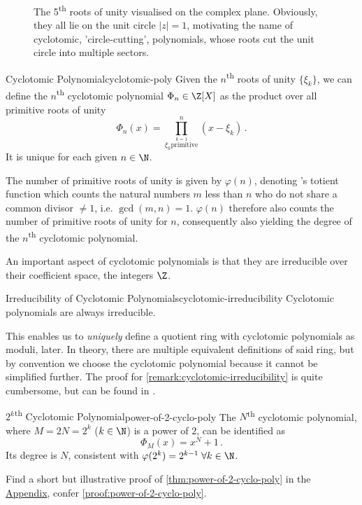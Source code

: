 \begin{figure}
  \centering
  \caption[The 5th roots of unity]{The 5\textsuperscript{th} roots of unity visualised on the complex plane. Obviously, they all lie on the unit circle $|z| = 1$, motivating the name of cyclotomic, 'circle-cutting', polynomials, whose roots cut the unit circle into multiple sectors.}
  \label{fig:nth-roots-of-unity}
\end{figure}

\begin{definition}{Cyclotomic Polynomial}{cyclotomic-poly}
  Given the $n$\textsuperscript{th} roots of unity $\{\xi_k\}$, we can define the $n$\textsuperscript{th}
  cyclotomic polynomial $\Phi_n \in \Z[X]$ as the product over all primitive roots of unity
  $$\Phi_n(x) = \prod_{\stackrel{k=1}{\xi_k \mathrm{primitive}}}^{n} (x - \xi_k) \,.$$
  It is unique for each given $n \in \N$.
\end{definition}
The number of primitive roots of unity is given by $\varphi(n)$, denoting 's totient function which counts the natural numbers $m$ less than $n$ who do not share a common divisor $\neq 1$, i.e. $\gcd(m, n) = 1$.
$\varphi(n)$ therefore also counts the number of primitive roots of unity for $n$, consequently also yielding the degree of the $n$\textsuperscript{th} cyclotomic polynomial.

An important aspect of cyclotomic polynomials is that they are irreducible over their coefficient space, the integers $\Z$.
\begin{remark}{Irreducibility of Cyclotomic Polynomials}{cyclotomic-irreducibility}
  Cyclotomic polynomials are always irreducible.
\end{remark}
This enables us to \textit{uniquely} define a quotient ring with cyclotomic polynomials as moduli, later.
In theory, there are multiple equivalent definitions of said ring, but by convention we choose the cyclotomic polynomial because it cannot be simplified further.
The proof for \autoref{remark:cyclotomic-irreducibility} is quite cumbersome, but can be found in \cite{2002-serge-algebra}.

\begin{theorem}{$2^k$\textsuperscript{th} Cyclotomic Polynomial}{power-of-2-cyclo-poly}
  The $N$\textsuperscript{th} cyclotomic polynomial, where $M = 2N = 2^k$ ($k \in \N$) is a power of $2$, can be identified as
  $$\Phi_{M}(x) = x^{N} + 1\,.$$
  Its degree is $N$, consistent with $\varphi(2^k) = 2^{k-1} \; \forall k \in \N$.
\end{theorem}
Find a short but illustrative proof of \autoref{thm:power-of-2-cyclo-poly} in the \hyperref[chap:appendix]{Appendix}, confer \autoref{proof:power-of-2-cyclo-poly}.

